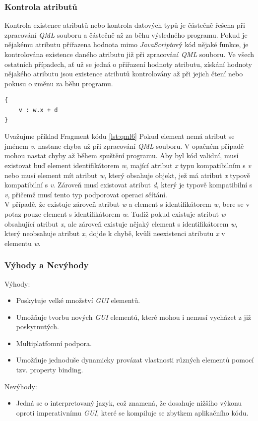\documentclass[11pt,twoside,a4paper]{book}
\begin{document}
{{\begin{ttemize}
{{\subsubsection{Kontrola atributů}
Kontrola existence atributů nebo kontrola datových typů je částečně řešena při zpracování \textit{QML} souboru a částečně až za běhu výsledného programu. Pokud je nějakému atributu přiřazena hodnota mimo \textit{JavaScript}ový kód nějaké funkce, je kontrolována existence daného atributu již při zpracování \textit{QML} souboru. Ve všech ostatních případech, ať už se jedná o přiřazení hodnoty atributu, získání hodnoty nějakého atributu jsou existence atributů kontrolovány až při jejich čtení nebo pokusu o změnu za běhu programu.
\begin{lstlisting}[frame=single,caption=Ukázka použití komponenty z jiného souboru.,label=lst:qml6]
{
	v : w.x + d
}
\end{lstlisting}
Uvažujme příklad Fragment kódu \ref{lst:qml6} Pokud element nemá atribut se jménem \textit{v}, nastane chyba už při zpracování \textit{QML} souboru. V opačném případě mohou nastat chyby až během spuštění programu. Aby byl kód validní, musí existovat buď element identifikátorem \textit{w}, mající atribut \textit{x} typu kompatibilním s \textit{v} nebo musí element mít atribut \textit{w}, který obsahuje objekt, jež má atribut \textit{x} typově kompatibilní s \textit{v}. Zároveň musí existovat atribut \textit{d}, který je typově kompatibilní s \textit{v}, přičemž musí tento typ podporovat operaci sčítání.\\
V případě, že existuje zároveň atribut \textit{w} a element s identifikátorem \textit{w}, bere se v potaz pouze element s identifikátorem \textit{w}. Tudíž pokud existuje atribut \textit{w} obsahující atribut \textit{x}, ale zároveň existuje nějaký element s identifikátorem \textit{w}, který neobsahuje atribut \textit{x}, dojde k chybě, kvůli neexistenci atributu \textit{x} v elementu \textit{w}. 

\subsubsection{Výhody a Nevýhody}
Výhody:
\begin{itemize}
  \item Poskytuje velké množství \textit{GUI} elementů.
  \item Umožňuje tvorbu nových \textit{GUI} elementů, které mohou i nemusí vycházet z již poskytnutých.
  \item Multiplatfomní podpora.
  \item Umožňuje jednoduše dynamicky provázat vlastnosti různých elementů pomocí tzv. property binding.
\end{itemize}
Nevýhody:
\begin{itemize}
  \item Jedná se o interpretovaný jazyk, což znamená, že dosahuje nižšího výkonu oproti imperativnímu \textit{GUI}, které se kompiluje se zbytkem aplikačního kódu.
\end{itemize}







}}
\end{ttemize}}}
\end{document}
